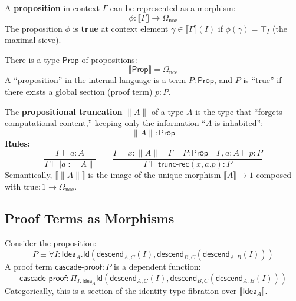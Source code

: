 \begin{definition}
\label{def:prop-via-omega}
A \textbf{proposition} in context $\Gamma$ can be represented as a morphism:
\[
  \phi : \llbracket \Gamma \rrbracket \to \Omega_{\mathrm{noe}}
\]
The proposition $\phi$ is \textbf{true} at context element $\gamma \in \llbracket \Gamma \rrbracket(I)$
if $\phi(\gamma) = \top_I$ (the maximal sieve).
\end{definition}

\begin{proposition}
\label{prop:prop-omega}
There is a type $\mathsf{Prop}$ of propositions:
\[
  \llbracket \mathsf{Prop} \rrbracket = \Omega_{\mathrm{noe}}
\]
A ``proposition'' in the internal language is a term $P : \mathsf{Prop}$, and
$P$ is ``true'' if there exists a global section (proof term) $p : P$.
\end{proposition}

\begin{definition}
\label{def:truncation}
The \textbf{propositional truncation} $\|A\|$ of a type $A$ is the type that
``forgets computational content,'' keeping only the information ``$A$ is inhabited'':
\[
  \|A\| : \mathsf{Prop}
\]
\textbf{Rules:}
\[
  \frac{\Gamma \vdash a : A}
       {\Gamma \vdash |a| : \|A\|}
  \qquad
  \frac{\Gamma \vdash x : \|A\| \quad \Gamma \vdash P : \mathsf{Prop} \quad \Gamma, a : A \vdash p : P}
       {\Gamma \vdash \mathsf{trunc\text{-}rec}(x, a.p) : P}
\]
Semantically, $\llbracket \|A\| \rrbracket$ is the image of the unique morphism
$\llbracket A \rrbracket \to 1$ composed with $\mathrm{true} : 1 \to \Omega_{\mathrm{noe}}$.
\end{definition}

\subsection{Proof Terms as Morphisms}
\label{subsec:proof-terms}

\begin{example}
\label{ex:proof-cascade}
Consider the proposition:
\[
  P \equiv \forall I : \mathsf{Idea}_A. \mathsf{Id}(\mathsf{descend}_{A,C}(I), \mathsf{descend}_{B,C}(\mathsf{descend}_{A,B}(I)))
\]
A proof term $\mathsf{cascade\text{-}proof} : P$ is a dependent function:
\[
  \mathsf{cascade\text{-}proof} : \Pi_{I : \mathsf{Idea}_A} \mathsf{Id}(\mathsf{descend}_{A,C}(I), \mathsf{descend}_{B,C}(\mathsf{descend}_{A,B}(I)))
\]
Categorically, this is a section of the identity type fibration over $\llbracket \mathsf{Idea}_A \rrbracket$.
\end{example}

